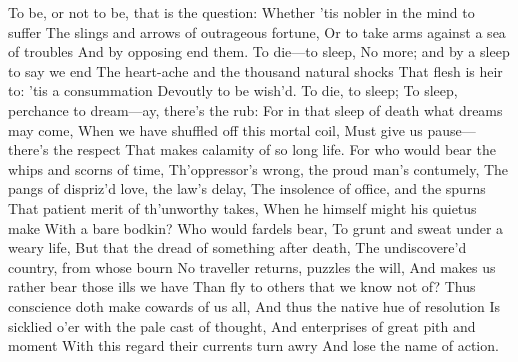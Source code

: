 \documentclass[fontsize=9, a5paper]{scrbook}
\begin{document}
\begin{poem}
	\begin{stanza}
		To be, or not to be, that is the question:\verseline
		Whether 'tis nobler in the mind to suffer\verseline
		The slings and arrows of outrageous fortune,\verseline
		Or to take arms against a sea of troubles\verseline
		And by opposing end them. To die—to sleep,\verseline
		No more; and by a sleep to say we end\verseline
		The heart-ache and the thousand natural shocks\verseline
		That flesh is heir to: 'tis a consummation\verseline
		Devoutly to be wish'd. To die, to sleep;\verseline
		To sleep, perchance to dream—ay, there's the rub:\verseline
		For in that sleep of death what dreams may come,\verseline
		When we have shuffled off this mortal coil,\verseline
		Must give us pause—there's the respect\verseline
		That makes calamity of so long life.\verseline
		For who would bear the whips and scorns of time,\verseline
		Th'oppressor's wrong, the proud man's contumely,\verseline
		The pangs of dispriz'd love, the law's delay,\verseline
		The insolence of office, and the spurns\verseline
		That patient merit of th'unworthy takes,\verseline
		When he himself might his quietus make\verseline
		With a bare bodkin? Who would fardels bear,\verseline
		To grunt and sweat under a weary life,\verseline
		But that the dread of something after death,\verseline
		The undiscovere'd country, from whose bourn\verseline
		No traveller returns, puzzles the will,\verseline
		And makes us rather bear those ills we have\verseline
		Than fly to others that we know not of?\verseline
		Thus conscience doth make cowards of us all,\verseline
		And thus the native hue of resolution\verseline
		Is sicklied o'er with the pale cast of thought,\verseline
		And enterprises of great pith and moment\verseline
		With this regard their currents turn awry\verseline
		And lose the name of action.
	\end{stanza}
\end{poem}
\end{document}
